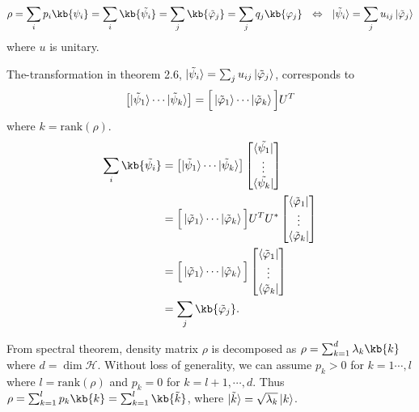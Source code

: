 \begin{screen}
%
    \begin{align*}
        \rho = \sum_i p_i \kb{\psi_i}
            = \sum_i \kb{\tilde{\psi_i}}
            = \sum_j \kb{\tilde{\varphi}_j}
            = \sum_j q_j \kb{\varphi_j}
                ~~ \Leftrightarrow ~~
            \ket{\tilde{\psi}_i} = \sum_j u_{ij} \ket{\tilde{\varphi}_j}
    \end{align*}
    where $u$ is unitary.

	The-transformation in theorem 2.6, $\ket{\tilde{\psi}_i} = \sum_j u_{ij} \ket{\tilde{\varphi}_j}$, corresponds to
	\begin{align*}
	    \left[ \ket{\tilde{\psi}_1} \cdots \ket{\tilde{\psi}_k} \right] = \Big[ \ket{\tilde{\varphi}_1} \cdots \ket{\tilde{\varphi}_k} \Big] U^T
	\end{align*}
	where $k = \mathrm{rank} (\mathcal{\rho})$.
    \begin{align}
        \sum_i \kb{\tilde{\psi_i}} &= \left[ \ket{\tilde{\psi}_1} \cdots \ket{\tilde{\psi}_k} \right]
            \begin{bmatrix}
                \bra{\tilde{\psi_1}}\\
                \vdots\\
                \bra{\tilde{\psi_k}}
            \end{bmatrix}\\
        &= \Big[ \ket{\tilde{\varphi}_1} \cdots \ket{\tilde{\varphi}_k} \Big] U^T
            U^* \begin{bmatrix}
                    \bra{\tilde{\varphi}_1}\\
                    \vdots\\
                    \bra{\tilde{\varphi}_k}
            \end{bmatrix}\\
        &= \Big[ \ket{\tilde{\varphi}_1} \cdots \ket{\tilde{\varphi}_k} \Big]
             \begin{bmatrix}
                \bra{\tilde{\varphi}_1}\\
                \vdots\\
                \bra{\tilde{\varphi}_k}
            \end{bmatrix}\\
        &= \sum_j \kb{\tilde{\varphi}_j}.
    \end{align}
\end{screen}

From spectral theorem, density matrix $\rho$ is decomposed as $\rho = \sum_{k=1}^{d} \lambda_k \kb{k}$ where $d = \dim \mathcal{H}$.
Without loss of generality, we can assume $p_k > 0$ for $k = 1 \cdots , l$ where $l = \mathrm{rank} (\rho)$ and $p_k = 0$ for $k = l+1, \cdots, d$.
Thus $\rho = \sum_{k=1}^{l} p_k \kb{k} = \sum_{k=1}^{l} \kb{\tilde{k}}$, where $\ket{\tilde{k}} = \sqrt{\lambda_k} \ket{k}$.

